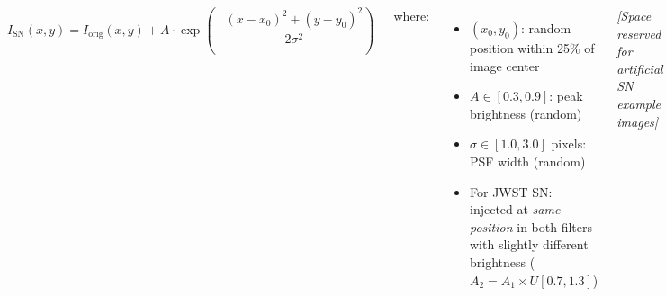 \documentclass[25pt, a0paper, portrait]{tikzposter}
\begin{document}
\begin{columns}
{    $$I_{\text{SN}}(x, y) = I_{\text{orig}}(x, y) + A \cdot
    \exp\!\left(-\frac{(x - x_0)^2 + (y - y_0)^2}{2\sigma^2}\right)$$

    where:
    \begin{itemize}[leftmargin=*, itemsep=2mm]
        \item $(x_0, y_0)$: random position within 25\% of image center
        \item $A \in [0.3, 0.9]$: peak brightness (random)
        \item $\sigma \in [1.0, 3.0]$ pixels: PSF width (random)
        \item For JWST SN: injected at \textit{same position} in both
              filters with slightly different brightness
              ($A_2 = A_1 \times U[0.7, 1.3]$)
    \end{itemize}

    \vspace{4mm}
    \textit{[Space reserved for artificial SN example images]}
}

\end{columns}


\end{document}
